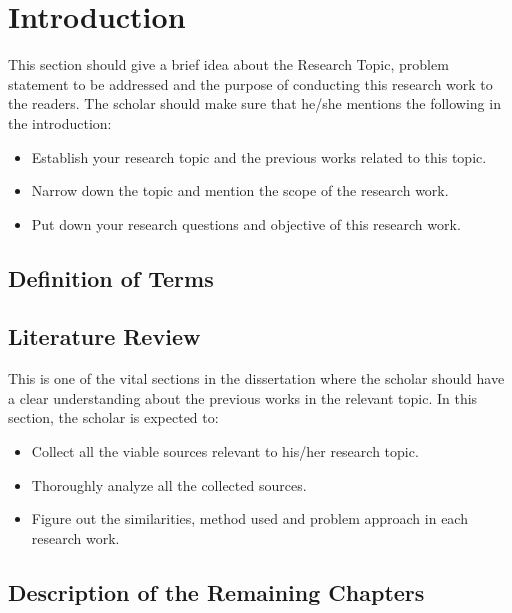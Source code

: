 \chapter{Introduction}
This section should give a brief idea about the Research Topic, problem statement to be addressed and the purpose of conducting this research work to the readers.
The scholar should make sure that he/she mentions the following in the introduction:

\begin{itemize}
  \item Establish your research topic and the previous works related to this topic.
  \item Narrow down the topic and mention the scope of the research work.
  \item Put down your research questions and objective of this research work.
\end{itemize}

\section{Definition of Terms}
\blindtext%

\section{Literature Review}
This is one of the vital sections in the dissertation where the scholar should have a clear understanding about the previous works in the relevant topic.
In this section, the scholar is expected to:

\begin{itemize}
  \item Collect all the viable sources relevant to his/her research topic.
  \item Thoroughly analyze all the collected sources.
  \item Figure out the similarities, method used and problem approach in each research work.
\end{itemize}

\section{Description of the Remaining Chapters}
\blindtext%
